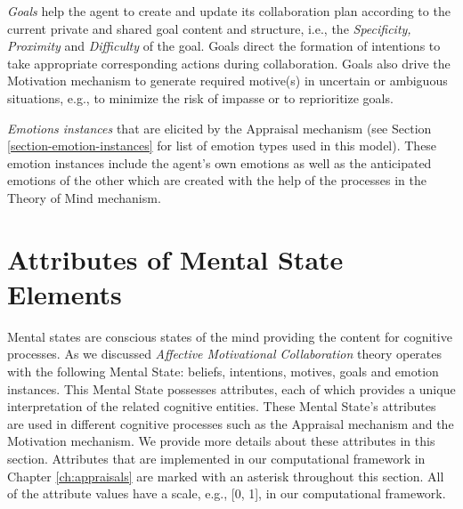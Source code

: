 \documentclass[12pt]{report}
\begin{document}
\textit{Goals} help the agent to create and update its collaboration plan
according to the current private and shared goal content and structure, i.e.,
the \textit{Specificity, Proximity} and \textit{Difficulty} of the goal. Goals
direct the formation of intentions to take appropriate corresponding actions
during collaboration. Goals also drive the Motivation mechanism to generate
required motive(s) in uncertain or ambiguous situations, e.g., to minimize the
risk of impasse or to reprioritize goals. 


\textit{Emotions instances}  that are elicited by the Appraisal mechanism (see
Section \ref{section-emotion-instances} for list of emotion types used in this
model). These emotion instances include the agent's own emotions as well as
the anticipated emotions of the other which are created with the help of the
processes in the Theory of Mind mechanism.

\section{Attributes of Mental State Elements}
\label{sec:mental-states-attributes}

Mental states are conscious states of the mind providing the content for
cognitive processes. As we discussed \textit{Affective Motivational
Collaboration} theory operates with the following Mental State: beliefs,
intentions, motives, goals and emotion instances. This Mental State possesses
attributes, each of which provides a unique interpretation of the related
cognitive entities. These Mental State's attributes are used in different
cognitive processes such as the Appraisal mechanism and the Motivation
mechanism. We provide more details about these attributes in this section.
Attributes that are implemented in our computational framework in Chapter
\ref{ch:appraisals} are marked with an asterisk throughout this section.
{\color{red}All of the attribute values have a scale, e.g., [0, 1], in our
computational framework.}
\end{document}

